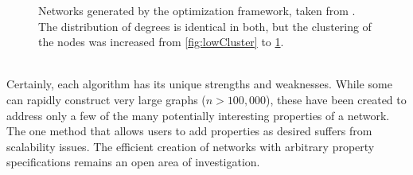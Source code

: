 \documentclass[11pt]{article}
\begin{document}
\begin{figure}[h!]
\begin{subfigure}{.35\textwidth}
    \caption{}
    \label{fig:highCluster}
  \end{subfigure}%
  \caption{Networks generated by the optimization framework, taken from \cite{karthikopt}. The distribution of degrees is identical in both, but the clustering of the nodes was increased from \ref{fig:lowCluster} to \ref{fig:highCluster}.}
  \label{fig:optCluster}
\end{figure}

\vspace{1mm}\\
Certainly, each algorithm has its unique strengths and weaknesses. While some can rapidly construct very large graphs ($n>100,000$), these have been created to address only a few of the many potentially interesting properties of a network. The one method that allows users to add properties as desired suffers from scalability issues. The efficient creation of networks with arbitrary property specifications remains an open area of investigation.
\end{document}
